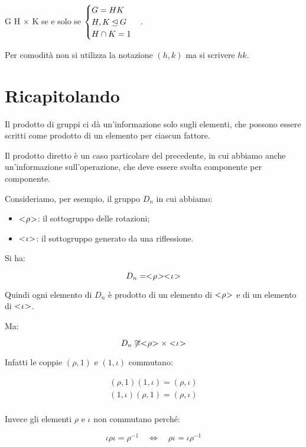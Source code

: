 \begin{teorema}
	G \isomorfo H $\times$ K se e solo se $\begin{cases}
		G=HK \\
		H, K \unlhd G \\
		H \cap K = 1
	\end{cases}$.
\end{teorema}

Per comodità non si utilizza la notazione $(h, k)$ ma si scrivere $hk$.

\section{Ricapitolando}

Il prodotto di gruppi ci dà un'informazione solo sugli elementi, che possono essere scritti come prodotto di un elemento per ciascun fattore.

Il prodotto diretto è un caso particolare del precedente, in cui abbiamo anche un'informazione sull'operazione, che deve essere svolta componente per componente.

Consideriamo, per esempio, il gruppo $D_n$ in cui abbiamo:

\begin{itemize}
	\item $< \negmedspace \rho \negmedspace >$: il sottogruppo delle rotazioni;
	\item $< \negmedspace \iota \negmedspace >$: il sottogruppo generato da una riflessione.
\end{itemize}

Si ha:

\begin{equation}
	D_n = < \negmedspace \rho \negmedspace >< \negmedspace \iota \negmedspace >
\end{equation}

Quindi ogni elemento di $D_n$ è prodotto di un elemento di $< \negmedspace \rho \negmedspace >$ e di un elemento di $< \negmedspace \iota \negmedspace >$.

Ma:

\begin{equation}
	D_n \not\cong < \negmedspace \rho \negmedspace > \times < \negmedspace \iota \negmedspace >
\end{equation}

Infatti le coppie $(\rho, 1)$ e $(1, \iota)$ commutano:

\begin{gather}
	(\rho, 1)(1, \iota) = (\rho,\iota) \\
	(1, \iota)(\rho, 1) = (\rho,\iota) \\
\end{gather}

Invece gli elementi $\rho$ e $\iota$ non commutano perché:

\begin{equation}
	\iota\rho\iota = \rho^{-1} \quad\Longleftrightarrow\quad \rho\iota = \iota\rho^{-1}
\end{equation}